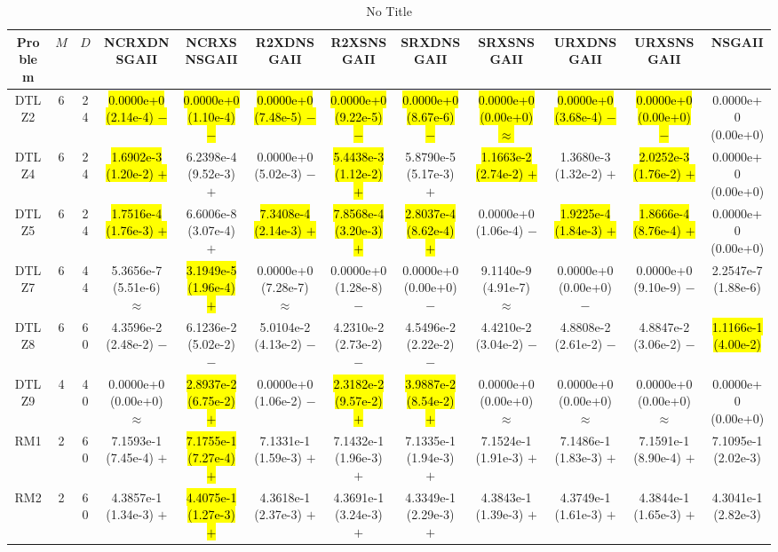\documentclass[journal]{IEEEtran}
\begin{document}
\begin{table*}[htbp]
\renewcommand{\arraystretch}{1.2}
\centering
\caption{No Title}
\begin{tabular}{cccccccccccc}
\toprule
Problem&$M$&$D$&NCRXDNSGAII&NCRXSNSGAII&R2XDNSGAII&R2XSNSGAII&SRXDNSGAII&SRXSNSGAII&URXDNSGAII&URXSNSGAII&NSGAII\\
\midrule
\multirow{1}{*}{DTLZ2}&6&24&\hl{0.0000e+0 (2.14e-4) $-$}&\hl{0.0000e+0 (1.10e-4) $-$}&\hl{0.0000e+0 (7.48e-5) $-$}&\hl{0.0000e+0 (9.22e-5) $-$}&\hl{0.0000e+0 (8.67e-6) $-$}&\hl{0.0000e+0 (0.00e+0) $\approx$}&\hl{0.0000e+0 (3.68e-4) $-$}&\hl{0.0000e+0 (0.00e+0) $-$}&0.0000e+0 (0.00e+0)\\
\hline
\multirow{1}{*}{DTLZ4}&6&24&\hl{1.6902e-3 (1.20e-2) $+$}&6.2398e-4 (9.52e-3) $+$&0.0000e+0 (5.02e-3) $-$&\hl{5.4438e-3 (1.12e-2) $+$}&5.8790e-5 (5.17e-3) $+$&\hl{1.1663e-2 (2.74e-2) $+$}&1.3680e-3 (1.32e-2) $+$&\hl{2.0252e-3 (1.76e-2) $+$}&0.0000e+0 (0.00e+0)\\
\hline
\multirow{1}{*}{DTLZ5}&6&24&\hl{1.7516e-4 (1.76e-3) $+$}&6.6006e-8 (3.07e-4) $+$&\hl{7.3408e-4 (2.14e-3) $+$}&\hl{7.8568e-4 (3.20e-3) $+$}&\hl{2.8037e-4 (8.62e-4) $+$}&0.0000e+0 (1.06e-4) $-$&\hl{1.9225e-4 (1.84e-3) $+$}&\hl{1.8666e-4 (8.76e-4) $+$}&0.0000e+0 (0.00e+0)\\
\hline
\multirow{1}{*}{DTLZ7}&6&44&5.3656e-7 (5.51e-6) $\approx$&\hl{3.1949e-5 (1.96e-4) $+$}&0.0000e+0 (7.28e-7) $\approx$&0.0000e+0 (1.28e-8) $-$&0.0000e+0 (0.00e+0) $-$&9.1140e-9 (4.91e-7) $\approx$&0.0000e+0 (0.00e+0) $-$&0.0000e+0 (9.10e-9) $-$&2.2547e-7 (1.88e-6)\\
\hline
\multirow{1}{*}{DTLZ8}&6&60&4.3596e-2 (2.48e-2) $-$&6.1236e-2 (5.02e-2) $-$&5.0104e-2 (4.13e-2) $-$&4.2310e-2 (2.73e-2) $-$&4.5496e-2 (2.22e-2) $-$&4.4210e-2 (3.04e-2) $-$&4.8808e-2 (2.61e-2) $-$&4.8847e-2 (3.06e-2) $-$&\hl{1.1166e-1 (4.00e-2)}\\
\hline
\multirow{1}{*}{DTLZ9}&4&40&0.0000e+0 (0.00e+0) $\approx$&\hl{2.8937e-2 (6.75e-2) $+$}&0.0000e+0 (1.06e-2) $-$&\hl{2.3182e-2 (9.57e-2) $+$}&\hl{3.9887e-2 (8.54e-2) $+$}&0.0000e+0 (0.00e+0) $\approx$&0.0000e+0 (0.00e+0) $\approx$&0.0000e+0 (0.00e+0) $\approx$&0.0000e+0 (0.00e+0)\\
\hline
\multirow{1}{*}{RM1}&2&60&7.1593e-1 (7.45e-4) $+$&\hl{7.1755e-1 (7.27e-4) $+$}&7.1331e-1 (1.59e-3) $+$&7.1432e-1 (1.96e-3) $+$&7.1335e-1 (1.94e-3) $+$&7.1524e-1 (1.91e-3) $+$&7.1486e-1 (1.83e-3) $+$&7.1591e-1 (8.90e-4) $+$&7.1095e-1 (2.02e-3)\\
\hline
\multirow{1}{*}{RM2}&2&60&4.3857e-1 (1.34e-3) $+$&\hl{4.4075e-1 (1.27e-3) $+$}&4.3618e-1 (2.37e-3) $+$&4.3691e-1 (3.24e-3) $+$&4.3349e-1 (2.29e-3) $+$&4.3843e-1 (1.39e-3) $+$&4.3749e-1 (1.61e-3) $+$&4.3844e-1 (1.65e-3) $+$&4.3041e-1 (2.82e-3)\\

\end{tabular}
\end{table*}
\end{document}
